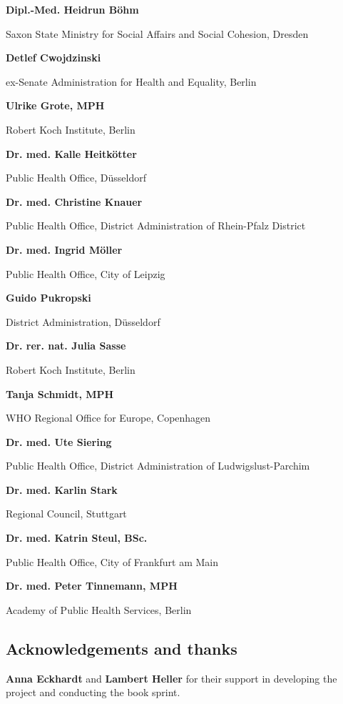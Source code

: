 \documentclass{article}
\begin{document}
\textbf{Dipl.-Med. Heidrun Böhm}

Saxon State Ministry for Social Affairs and Social Cohesion, Dresden


\textbf{Detlef Cwojdzinski}

ex-Senate Administration for Health and Equality, Berlin


\textbf{Ulrike Grote, MPH}

Robert Koch Institute, Berlin


\textbf{Dr. med. Kalle Heitkötter}

Public Health Office, Düsseldorf


\textbf{Dr. med. Christine Knauer}

Public Health Office, District Administration of Rhein-Pfalz District


\textbf{Dr. med. Ingrid Möller}

Public Health Office, City of Leipzig


\textbf{Guido Pukropski}

District Administration, Düsseldorf


\textbf{Dr. rer. nat. Julia Sasse}

Robert Koch Institute, Berlin


\textbf{Tanja Schmidt, MPH}

WHO Regional Office for Europe, Copenhagen


\textbf{Dr. med. Ute Siering}

Public Health Office, District Administration of Ludwigslust-Parchim


\textbf{Dr. med. Karlin Stark}

Regional Council, Stuttgart


\textbf{Dr. med. Katrin Steul, BSc.}

Public Health Office, City of Frankfurt am Main


\textbf{Dr. med. Peter Tinnemann, MPH}

Academy of Public Health Services, Berlin




\subsection{Acknowledgements and thanks}\label{H6834922}



\textbf{Anna Eckhardt }and\textbf{ Lambert Heller }for their support in\textbf{ }developing the project and conducting the book sprint.
\end{document}
